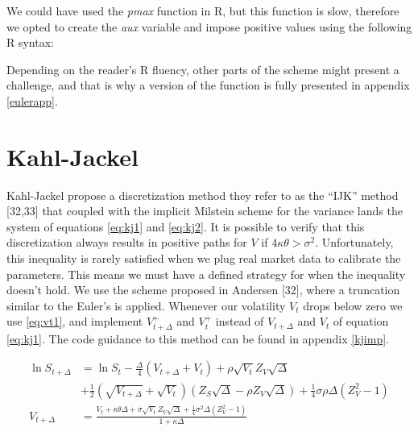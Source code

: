 \documentclass[12pt,twoside]{reedthesis}
\theoremstyle{definition}
\theoremstyle{definition}
\theoremstyle{remark}
\begin{document}
  We could have used the \emph{pmax} function in R, but this function is
  slow, therefore we opted to create the \emph{aux} variable and impose
  positive values using the following R syntax:
  \begin{Shaded}
  \begin{Highlighting}[]
  \StringTok{ }
  \NormalTok{  aux[v }\OperatorTok{<}\StringTok{ }\NormalTok{] <-}\StringTok{ }
  \end{Highlighting}
  \end{Shaded}
  Depending on the reader's R fluency, other parts of the scheme might
  present a challenge, and that is why a version of the function is fully
  presented in appendix \ref{eulerapp}.
  
  \section{Kahl-Jackel}\label{kahl-jackel}
  
  Kahl-Jackel propose a discretization method they refer to as the ``IJK''
  method {[}32,33{]} that coupled with the implicit Milstein scheme for
  the variance lands the system of equations \eqref{eq:kj1} and
  \eqref{eq:kj2}. It is possible to verify that this discretization always
  results in positive paths for \(V\) if \(4 \kappa \theta > \sigma^2\).
  Unfortunately, this inequality is rarely satisfied when we plug real
  market data to calibrate the parameters. This means we must have a
  defined strategy for when the inequality doesn't hold. We use the scheme
  proposed in Andersen {[}32{]}, where a truncation similar to the Euler's
  is applied. Whenever our volatility \(V_t\) drops below zero we use
  \eqref{eq:vt1}, and implement \(V_{t+\Delta}^{+}\) and \(V_t^{+}\) instead
  of \(V_{t+\Delta}\) and \(V_t\) of equation \eqref{eq:kj1}. The code
  guidance to this method can be found in appendix \ref{kjimp}.
  \begin{small}
  \begin{align}
  \label{eq:kj1}
  \ln S_{t + \Delta} &= \ln S_t - \frac{\Delta}{4}\left( V_{t+\Delta} + V_t \right) + \rho \sqrt{V_t} Z_V\sqrt{\Delta} \\ \nonumber
  &+ \frac{1}{2} \left( \sqrt{V_{t+\Delta}} + \sqrt{V_t} \right) \left( Z_S \sqrt{\Delta} - \rho Z_V \sqrt{\Delta}\right) + \frac{1}{4} \sigma \rho \Delta \left( Z_{V}^{2} - 1 \right) \\
  \label{eq:kj2}
  V_{t+\Delta} &= \frac{V_t + \kappa \theta \Delta + \sigma \sqrt{V_t} Z_V \sqrt{\Delta}+ \frac{1}{4}\sigma^2 \Delta \left(Z_V^2-1 \right)}{1+ \kappa \Delta}
  \end{align}
  \end{small}
\end{document}
